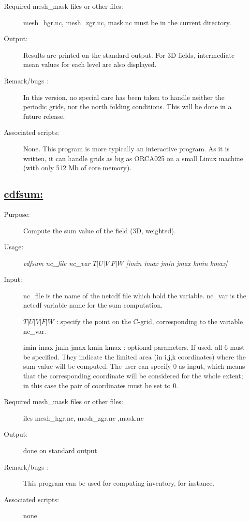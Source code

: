 \documentclass[a4paper,11pt]{article}
\begin{document}
\begin{description}
\item[Required mesh\_mask files or other files:]   mesh\_hgr.nc, mesh\_zgr.nc, mask.nc must be in the current directory.
\item[Output:] Results are printed  on the standard output. For 3D fields, intermediate mean values for each level are also
displayed.
\item[Remark/bugs :] In this version, no special care has been taken to handle neither the periodic grids, nor the north folding conditions.
This will be done in a future release.
\item[Associated scripts:] {None. This program is more typically an interactive program. As it is written, it can handle grids as big
as ORCA025 on a small Linux machine (with only 512 Mb of core memory).}
\end{description}

\newpage
\subsection*{\underline{cdfsum:}}
\begin{description}
\item[Purpose:] Compute the sum value of the field (3D, weighted).
\item[Usage:] {\em cdfsum nc\_file nc\_var $T| U | V | F | W$ [imin imax jmin jmax kmin kmax] }
\item[Input:] nc\_file is the name of the netcdf file which hold the variable.  nc\_var is the netcdf variable name for the
sum computation.

$ T | U | V | F | W $ : specify the point on the C-grid, corresponding to the variable nc\_var.

imin imax jmin jmax  kmin kmax : optional parameters. If used, all 6 must be specified. They indicate the limited
area (in i,j,k coordinates) where the sum value will be computed. The user can specify 0 as input, which means that
the corresponding coordinate will be considered for the whole extent; in this case the pair of coordinates must be set 
to 0. 

\item[Required mesh\_mask files or other files:] iles mesh\_hgr.nc, mesh\_zgr.nc ,mask.nc
\item[Output:] done on standard output
\item[Remark/bugs :] This program can be used for computing inventory, for instance.
\item[Associated scripts:] none
\end{description}
\end{document}
